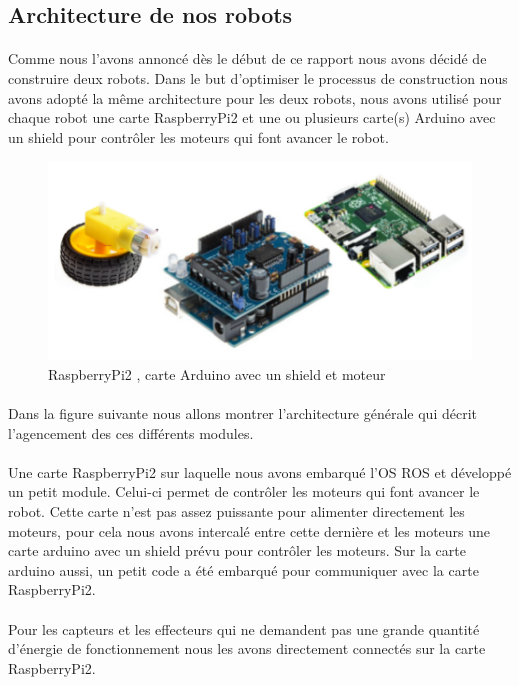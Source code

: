 \documentclass[12pt,a4paper]{article}
\begin{document}
\subsection{Architecture de nos robots}

\paragraph{}
Comme nous l'avons annoncé dès le début de ce rapport nous avons décidé de construire deux robots. Dans le but d'optimiser 
le processus de construction nous avons adopté la même architecture pour les deux robots, nous avons utilisé pour chaque robot 
une carte RaspberryPi2 et une ou plusieurs carte(s) Arduino avec un shield pour contrôler les moteurs qui font avancer le robot.


\begin{figure}[!h]
\centering
\includegraphics[width=10 cm]{img/img.jpeg}
\caption{RaspberryPi2 , carte Arduino avec un shield et moteur}
\end{figure}

\paragraph{}
Dans la figure suivante nous allons montrer l'architecture générale qui décrit l'agencement des ces différents modules. 
\paragraph{}
Une carte RaspberryPi2 sur laquelle nous avons embarqué l'OS ROS et développé un petit module. Celui-ci permet de contrôler
les moteurs qui font avancer le robot. Cette carte n'est pas assez puissante pour alimenter directement les moteurs, pour cela 
nous avons intercalé entre cette dernière et les moteurs une carte arduino avec un shield prévu pour contrôler les moteurs. 
Sur la carte arduino aussi, un petit code a été embarqué pour communiquer avec la carte RaspberryPi2.
\paragraph{}
Pour les capteurs et les effecteurs qui ne demandent pas une grande quantité d'énergie de fonctionnement nous les avons directement connectés 
sur la carte RaspberryPi2.
\end{document}
